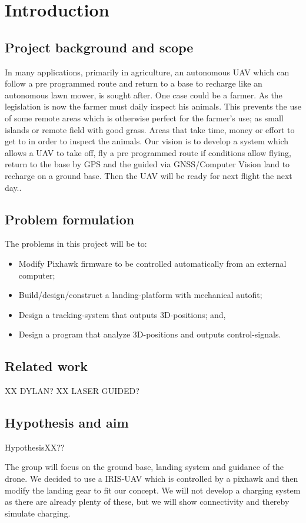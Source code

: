 \section{Introduction}
\subsection{Project background and scope}
In many applications, primarily in agriculture, an autonomous UAV which can follow a pre programmed route and return to a base to recharge like an autonomous lawn mower, is sought after. One case could be a farmer. As the legislation is now the farmer must daily inspect his animals. This prevents the use of some remote areas which is otherwise perfect for the farmer’s use; as small islands or remote field with good grass. Areas that take time, money or effort to get to in order to inspect the animals.
Our vision is to develop a system which allows a UAV to take off, fly a pre programmed route if conditions allow flying, return to the base by GPS and the guided via GNSS/Computer Vision land to recharge on a ground base. Then the UAV will be ready for next flight the next day..
\subsection{Problem formulation}
The problems in this project will be to:

\begin{itemize}
	\item Modify Pixhawk firmware to be controlled automatically from an external computer;
	\item Build/design/construct a landing-platform with mechanical autofit;
	\item Design a tracking-system that outputs 3D-positions; and,
	\item Design a program that analyze 3D-positions and outputs control-signals.
\end{itemize}

\subsection{Related work}
XX DYLAN?
XX LASER GUIDED?

\subsection{Hypothesis and aim}
HypothesisXX??

The group will focus on the ground base, landing system and guidance of the drone. We decided to use a IRIS-UAV which is controlled by a pixhawk and then modify the landing gear to fit our concept. We will not develop a charging system as there are already plenty of these, but we will show connectivity and thereby simulate charging.
 
